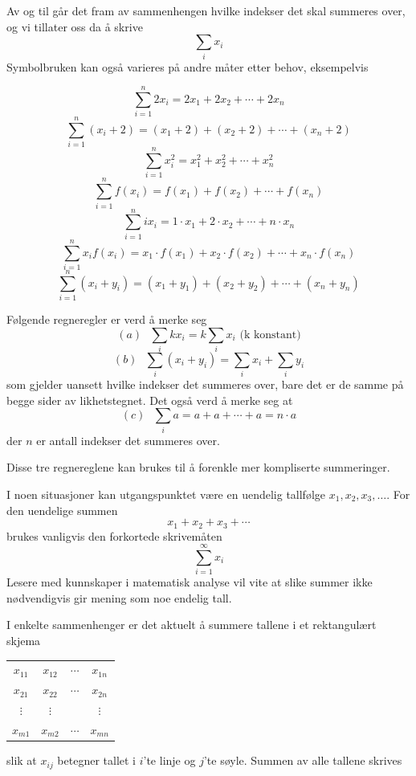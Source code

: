 Av og til går det fram av sammenhengen hvilke indekser det skal summeres over,
og vi tillater oss da å skrive
\[ \sum_{i} x_i   \]
Symbolbruken kan også varieres på andre måter etter behov, eksempelvis
\begin{center}
\[ \sum_{i=1}^{n} 2x_i = 2x_1 + 2x_2 + \cdots + 2x_n \]
\[ \sum_{i=1}^{n} (x_i+2) = (x_1+2) + (x_2 + 2) + \cdots + (x_n+2) \]
\[ \sum_{i=1}^{n} x_i^2 = x_1^2 + x_2^2 + \cdots + x_n^2 \]
\[ \sum_{i=1}^{n} f(x_i) = f(x_1) + f(x_2) + \cdots + f(x_n) \]
\[ \sum_{i=1}^{n} i x_i = 1\cdot x_1 + 2 \cdot x_2 + \cdots + n \cdot x_n \]
\[ \sum_{i=1}^{n} x_i f(x_i) = x_1 \cdot f(x_1) + x_2 \cdot f(x_2) + 
                   \cdots + x_n \cdot f(x_n) \]
\[ \sum_{i=1}^{n} (x_i+y_i) = (x_1+y_1) + (x_2 + y_2) + \cdots + (x_n+y_n) \]
\end{center}
Følgende regneregler er verd å merke seg
\[ (a) \mbox{\ \ } \sum_{i} k x_i = k \sum_{i} x_i \mbox{\ \ (k konstant)} \]
\[ (b) \mbox{\ \ } \sum_{i} (x_i + y_i) = \sum_{i} x_i + \sum_{i} y_i \]
som gjelder uansett hvilke indekser det summeres over, bare det er de samme 
på begge sider av likhetstegnet. Det også verd å merke seg at
\[ (c) \mbox{\ \ } \sum_{i} a = a + a + \cdots + a = n \cdot a \]
der $n$ er antall indekser det summeres over.

Disse tre regnereglene kan brukes til å forenkle mer kompliserte summeringer.

I noen situasjoner kan utgangspunktet være en uendelig tallfølge 
$x_1, x_2, x_3, \ldots$. For den uendelige summen
\[ x_1 + x_2 + x_3 + \cdots   \]
brukes vanligvis den forkortede skrivemåten
\[ \sum_{i=1}^{\infty} x_i   \]
Lesere med kunnskaper i matematisk analyse vil vite at slike summer
ikke nødvendigvis gir mening som noe endelig tall.

I enkelte sammenhenger er det aktuelt å summere tallene i et
rektangulært skjema
\begin{center}
\begin{tabular}{cccc}
              $x_{11}$& $x_{12}$& $\cdots$& $x_{1n}$ \\
              $x_{21}$& $x_{22}$& $\cdots$& $x_{2n}$ \\
              $\vdots$& $\vdots$&         & $\vdots$ \\
              $x_{m1}$& $x_{m2}$& $\cdots$& $x_{mn}$
\end{tabular}
\end{center}
slik at $x_{ij}$ betegner tallet i $i$'te linje og $j$'te søyle.
Summen av alle tallene skrives

